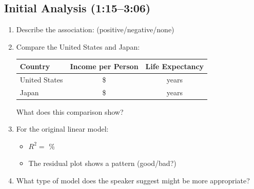 \documentclass[11pt]{article}
\begin{document}
\subsection*{Initial Analysis (1:15--3:06)}
\begin{enumerate}[resume, label=\arabic*.]
\item Describe the association: \underline{\hspace{1in}} (positive/negative/none)

\item Compare the United States and Japan:
\begin{center}
\begin{tabular}{|l|c|c|}
\hline
Country & Income per Person & Life Expectancy \\
\hline
United States & \$\underline{\hspace{0.8in}} & \underline{\hspace{0.5in}} years \\
\hline
Japan & \$\underline{\hspace{0.8in}} & \underline{\hspace{0.5in}} years \\
\hline
\end{tabular}
\end{center}

What does this comparison show? \underline{\hspace{3in}}

\item For the original linear model:
\begin{itemize}
\item $R^2 = $ \underline{\hspace{0.5in}}\%
\item The residual plot shows a \underline{\hspace{1.5in}} pattern (good/bad?)
\end{itemize}

\item What type of model does the speaker suggest might be more appropriate? \underline{\hspace{1.5in}}
\end{enumerate}
\end{document}
